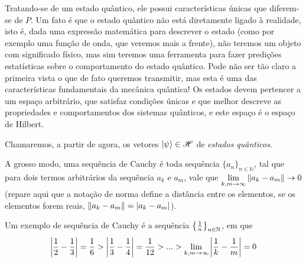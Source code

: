 Tratando-se de um estado quântico, ele possui características únicas que diferem-se de $P$. Um fato é que o estado quântico não está diretamente ligado à realidade, isto é, dada uma expressão matemática para descrever o estado (como por exemplo uma função de onda, que veremos mais a frente), não teremos um objeto com significado físico, mas sim teremos uma ferramenta para fazer predições estatísticas sobre o comportamento do estado quântico. Pode não ser tão claro a primeira vista o que de fato queremos transmitir, mas esta é uma das características fundamentais da mecânica quântica! Os estados devem pertencer a um espaço arbitrário, que satisfaz condições únicas e que melhor descreve as propriedades e comportamentos dos sistemas quânticos, e este espaço é o espaço de Hilbert.

\begin{note}{}
    Chamaremos, a partir de agora, os vetores $\ket{\psi}\in\mathscr{H}$ de \textit{estados quânticos}.
\end{note}

\begin{note}{}
    A grosso modo, uma sequência de Cauchy é toda sequência $\{a_{n}\}_{n\in\mathbb{N}}$, tal que para dois termos arbitrários da sequência $a_{k}$ e $a_{m}$, vale que $\displaystyle\lim_{k,m\to \infty}\norm{a_{k} - a_{m}}\to 0$ (repare aqui que a notação de norma define a distância entre os elementos, se os elementos forem reais, $\norm{a_{k} - a_{m}} = \abs{a_{k} - a_{m}}$). 
    
    Um exemplo de sequência de Cauchy é a sequência $\qty{\frac{1}{n}}_{n\in\mathbb{N}}$, em que 
    \begin{equation*}
        \abs{\frac{1}{2} - \frac{1}{3}} = \frac{1}{6} > 
        \abs{\frac{1}{3} - \frac{1}{4}} = \frac{1}{12} > ... > 
        \lim_{k,m\to\infty}\abs{\frac{1}{k} - \frac{1}{m}} = 0
    \end{equation*}
\end{note}

